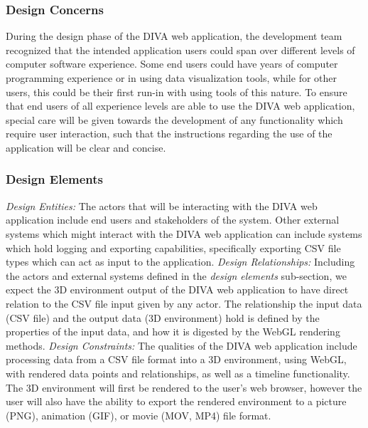\documentclass[journal,10pt,onecolumn,compsoc]{IEEEtran} \usepackage[margin=1.0in]{geometry} \usepackage{pdfpages}
\begin{document}
        \subsubsection{Design Concerns}
        During the design phase of the DIVA web application, the development team recognized that the intended application users could span over different levels of computer software experience. Some end users could have years of computer programming experience or in using data visualization tools, while for other users, this could be their first run-in with using tools of this nature. To ensure that end users of all experience levels are able to use the DIVA web application, special care will be given towards the development of any functionality which require user interaction, such that the instructions regarding the use of the application will be clear and concise. 
        \subsubsection{Design Elements}
        \textit{Design Entities: } The actors that will be interacting with the DIVA web application include end users and stakeholders of the system. Other external systems which might interact with the DIVA web application can include systems which hold logging and exporting capabilities, specifically exporting CSV file types which can act as input to the application. \newline
        \newline \textit{Design Relationships: } Including the actors and external systems defined in the \textit{design elements} sub-section, we expect the 3D environment output of the DIVA web application to have direct relation to the CSV file input given by any actor. The relationship the input data (CSV file) and the output data (3D environment) hold is defined by the properties of the input data, and how it is digested by the WebGL rendering methods. \newline
        \newline \textit{Design Constraints: } The qualities of the DIVA web application include processing data from a CSV file format into a 3D environment, using WebGL, with rendered data points and relationships, as well as a timeline functionality. The 3D environment will first be rendered to the user's web browser, however the user will also have the ability to export the rendered environment to a picture (PNG), animation (GIF), or movie (MOV, MP4) file format.
\end{document}
